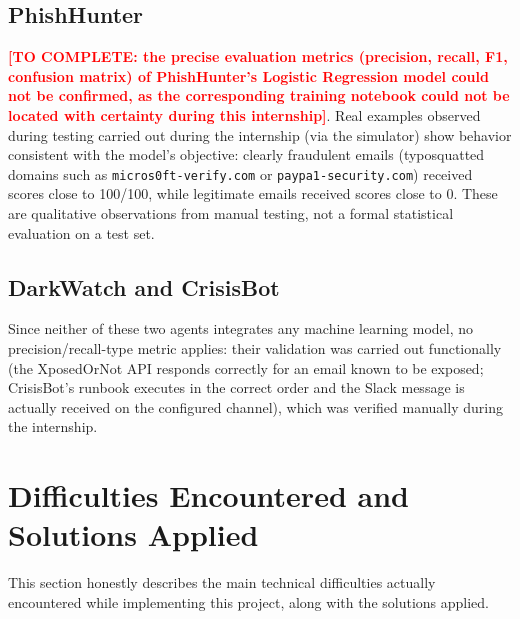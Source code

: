 \documentclass[12pt,a4paper]{report}
\newcommand{\TODO}[1]{\textcolor{red}{\textbf{[TO COMPLETE: #1]}}}
\begin{document}
\subsection*{PhishHunter}
\TODO{the precise evaluation metrics (precision, recall, F1, confusion matrix) of PhishHunter's Logistic Regression model could not be confirmed, as the corresponding training notebook could not be located with certainty during this internship}. Real examples observed during testing carried out during the internship (via the simulator) show behavior consistent with the model's objective: clearly fraudulent emails (typosquatted domains such as \texttt{micros0ft-verify.com} or \texttt{paypa1-security.com}) received scores close to 100/100, while legitimate emails received scores close to 0. These are qualitative observations from manual testing, not a formal statistical evaluation on a test set.

\subsection*{DarkWatch and CrisisBot}
\begin{sloppypar}
Since neither of these two agents integrates any machine learning model, no precision/recall-type metric applies: their validation was carried out functionally (the XposedOrNot API responds correctly for an email known to be exposed; CrisisBot's runbook executes in the correct order and the Slack message is actually received on the configured channel), which was verified manually during the internship.
\end{sloppypar}

\section{Difficulties Encountered and Solutions Applied}

This section honestly describes the main technical difficulties actually encountered while implementing this project, along with the solutions applied.
\end{document}
